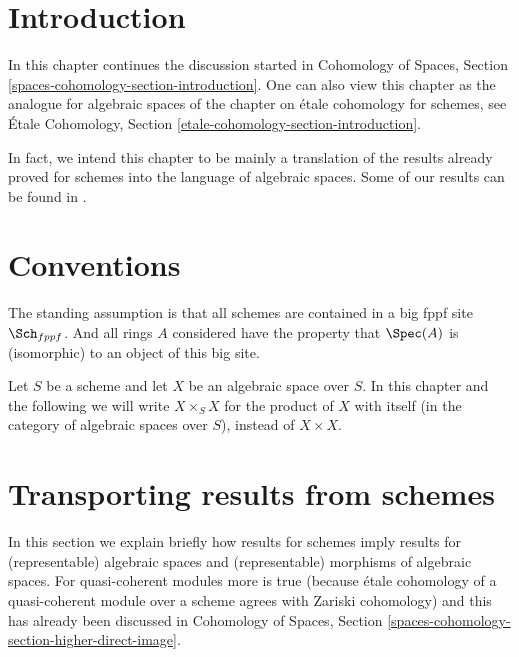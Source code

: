 \section{Introduction}
\label{spaces-more-cohomology-section-introduction}
In this chapter continues the discussion started in
Cohomology of Spaces, Section \ref{spaces-cohomology-section-introduction}.
One can also view this chapter as the analogue for algebraic spaces
of the chapter on \'etale cohomology for schemes, see
\'Etale Cohomology, Section \ref{etale-cohomology-section-introduction}.

\medskip\noindent
In fact, we intend this chapter to be mainly a translation of the
results already proved for schemes into the language of algebraic
spaces. Some of our results can be found in \cite{Kn}.

\section{Conventions}
\label{spaces-more-cohomology-section-conventions}
The standing assumption is that all schemes are contained in
a big fppf site $\Sch_{fppf}$. And all rings $A$ considered
have the property that $\Spec(A)$ is (isomorphic) to an
object of this big site.

\medskip\noindent
Let $S$ be a scheme and let $X$ be an algebraic space over $S$.
In this chapter and the following we will write $X \times_S X$
for the product of $X$ with itself (in the category of algebraic
spaces over $S$), instead of $X \times X$.

\section{Transporting results from schemes}
\label{spaces-more-cohomology-section-api}
In this section we explain briefly how results for schemes
imply results for (representable) algebraic spaces and
(representable) morphisms of algebraic spaces.
For quasi-coherent modules more is true
(because \'etale cohomology of a quasi-coherent module
over a scheme agrees with Zariski cohomology) and this
has already been discussed in Cohomology of Spaces, Section
\ref{spaces-cohomology-section-higher-direct-image}.

